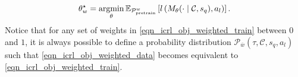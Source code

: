 \documentclass{article}
\newtheorem{proposition}{Proposition}
\newtheorem{theorem}{Theorem}
\begin{document}
\begin{align}\label{eqn_icrl_obj_weighted_data}
    \theta_w^\star = \argmin_\theta \mbE_{\ccalP_{\text{pretrain}}^w} \left[ l \left( M_\theta(\cdot \mid \ccalC, s_{q}), a_{l}\right) \right].
\end{align}
%
Notice that for any set of weights in \eqref{eqn_icrl_obj_weighted_train} between $0$ and $1$, it is always possible to define a probability distribution $\mathcal{P}_{\bar{w}}(\tau,\mathcal{C},s_q,a_l)$ such that \eqref{eqn_icrl_obj_weighted_data} becomes equivalent to  \eqref{eqn_icrl_obj_weighted_train}.






%






\end{document}
